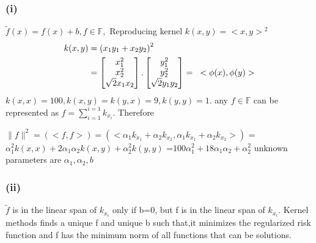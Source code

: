\documentclass[12pt,a4paper]{article}
\begin{document}
	 \subsubsection*{(i)}
	 $\tilde{f}(x) = f(x) + b, f \in \mathbb{F}, $
	 Reproducing kernel $ k(x,y) = {<x,y>}^2$ 
	 \begin{equation*}
	 \begin{split}
	 	 	k(x,y) & = {(x_1y_1+x_2y_2)}^2 \\
	 	 	& = \begin{bmatrix}
	 	 	    x_1^2 \\ x_2^2 \\ \sqrt{2}x_1x_2
	 	 	    \end{bmatrix}.\begin{bmatrix}
	 	     	y_1^2 \\ y_2^2 \\ \sqrt{2}y_1y_2
	 	    	\end{bmatrix}
	 	      = \hspace*{2ex}<\phi(x), \phi(y)>
	 \end{split}
	 \end{equation*}
	 $k(x,x) = 100, k(x,y)=k(y,x)=9, k(y,y)=1$.
	 any $ f \in \mathbb{F} $ can be represented as $ f = \sum_{i=1}^{i=1} k_{x_i}$. Therefore\newline
	 
	 $ \|f\|^2  = (<f,f>) 
	            = (<\alpha_1k_{x_1}+\alpha_2k_{x_2}, \alpha_1k_{x_1}+\alpha_2k_{x_2} >) $\newline
	 \hspace*{9ex}= $\alpha_1^2k(x,x)+2\alpha_1\alpha_2k(x,y)+\alpha_2^2k(y,y)$\newline
	 \hspace*{9ex}=$100\alpha_1^2+18\alpha_1\alpha_2+\alpha_2^2$\newline
	 unknown parameters are $\alpha_1, \alpha_2, b$
	 \subsubsection*{(ii)}
	 $\tilde{f}$ is in the linear span of $k_{x_i}$ only if b=0, but f is in the linear span of $k_{x_i}$.\newline
	 Kernel methods finds a unique f and unique b such that,it minimizes the regularized risk function and  f has the minimum norm of all functions that can be solutions. 
	          
\end{document}
